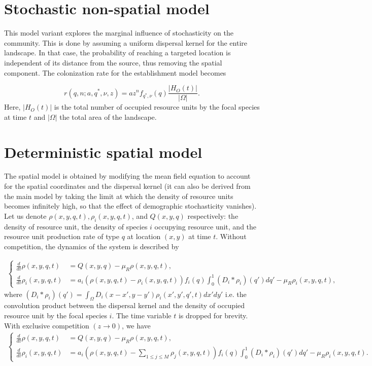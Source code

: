 \documentclass[8pt,a4paper]{article}
\begin{document}
\section{Stochastic non-spatial model}

This model variant explores the marginal influence of stochasticity on the community. This is done by assuming a uniform dispersal kernel for the entire landscape. In that case, the probability of reaching a targeted location is independent of its distance from the source, thus removing the spatial component.  The colonization rate for the establishment model becomes 

\begin{equation*}
r(q, n ; a , q^*, \nu, z) = a z^n f_{q^*, \nu} (q)\frac{|H_O(t)|}{|\Omega|}.
\end{equation*}
Here, $|H_O(t)|$ is the total number of occupied resource units by the focal species at time $t$ and $|\Omega|$ the total area of the landscape.

\section{Deterministic spatial model}

The spatial model is obtained by modifying the mean field equation to account for the spatial coordinates and the dispersal kernel (it can also be derived from the main model by taking the limit at which the density of resource units becomes infinitely high, so that the effect of demographic stochasticity vanishes).  Let us denote $\rho(x,y,q,t), \rho_i (x,y ,q,t)$, and  $Q(x,y,q)$ respectively:  the density of resource unit,  the density of species $i$ occupying resource unit, and the resource unit production rate of type $q$ at location $(x,y)$ at time $t$. 
Without competition, the dynamics of the system is described by

\begin{align*}
\begin{cases}
\displaystyle  \frac{d}{dt} \rho(x,y,q,t) & =  Q(x,y,q) - \mu_R \rho(x,y,q,t), \\
\displaystyle \frac{d}{dt} \rho_i (x,y,q,t) & =  a_i \left( \rho(x,y,q,t)- \rho_i(x,y,q,t) \right) f_i(q) \int_0^1 (D_i \ast \rho_i) (q') dq' - \mu_R \rho_i(x,y,q,t), 
\end{cases}
\end{align*}
where $(D_i \ast \rho_i)(q') = \int_{\Omega} D_i(x- x', y-y') \rho_i(x',y',q',t) dx' dy'$ i.e. the convolution product between the dispersal kernel and the density of occupied resource unit by the focal species $i$. The time variable $t$  is dropped for brevity.  
With exclusive competition $(z \rightarrow 0)$, we have   
\begin{align*}
\begin{cases}
\displaystyle \frac{d}{dt} \rho(x,y,q,t) &=  Q(x,y,q) - \mu_R \rho(x,y,q,t), \\
\displaystyle \frac{d}{dt}  \rho_i (x,y,q,t) &=  a_i \left( \rho(x,y,q,t)- \sum_{1\leq j \leq M}\rho_j(x,y,q,t) \right) f_i(q) \int_0^1 (D_i \ast \rho_i) (q') dq' - \mu_R \rho_i(x,y,q,t).
\end{cases}
\end{align*}
\end{document}
